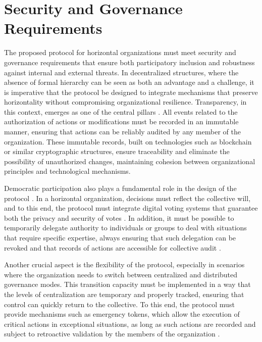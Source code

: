 \section{Security and Governance Requirements}
\label{sec:security_governance_requirements}

The proposed protocol for horizontal organizations must meet security and
governance requirements that ensure both participatory inclusion and robustness
against internal and external threats. In decentralized structures, where the
absence of formal hierarchy can be seen as both an advantage and a challenge, it
is imperative that the protocol be designed to integrate mechanisms that
preserve horizontality without compromising organizational resilience.
Transparency, in this context, emerges as one of the central pillars
\cite{Colbac}. All events related to the authorization of actions or
modifications must be recorded in an immutable manner, ensuring that actions can
be reliably audited by any member of the organization. These immutable records,
built on technologies such as blockchain or similar cryptographic structures,
ensure traceability and eliminate the possibility of unauthorized changes,
maintaining cohesion between organizational principles and technological
mechanisms.

Democratic participation also plays a fundamental role in the design of the
protocol \cite{Colbac}. In a horizontal organization, decisions must reflect the
collective will, and to this end, the protocol must integrate digital voting
systems that guarantee both the privacy and security of votes \cite{Colbac}. In
addition, it must be possible to temporarily delegate authority to individuals
or groups to deal with situations that require specific expertise, always
ensuring that such delegation can be revoked and that records of actions are
accessible for collective audit \cite{Colbac}.

Another crucial aspect is the flexibility of the protocol, especially in
scenarios where the organization needs to switch between centralized and
distributed governance modes. This transition capacity must be implemented in a
way that the levels of centralization are temporary and properly tracked,
ensuring that control can quickly return to the collective. To this end, the
protocol must provide mechanisms such as emergency tokens, which allow the
execution of critical actions in exceptional situations, as long as such actions
are recorded and subject to retroactive validation by the members of the
organization \cite{Colbac}.

